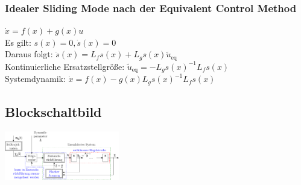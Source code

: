 \documentclass[german]{latex4ei/latex4ei_sheet}
\begin{document}
\subsubsection*{Idealer Sliding Mode nach der Equivalent Control Method}
$\dot{x} = f(x) + g(x)u$ \\
Es gilt: $s(x) = 0, \dot{s}(x) = 0$ \\
Daraus folgt: $\dot{s}(x) = L_f s(x) + L_g s(x) \tilde{u}_\text{eq}$ \\
Kontinuierliche Ersatzstellgröße: $\tilde{u}_\text{eq} = -L_g s(x) ^{-1} L_f s(x)$ \\
Systemdynamik: $\dot{x} = f(x) - g(x) L_g s(x)^{-1} L_f s(x)$

\subsection{Blockschaltbild}
\includegraphics[angle=90, width=5cm]{./img/block.pdf}
\end{document}
